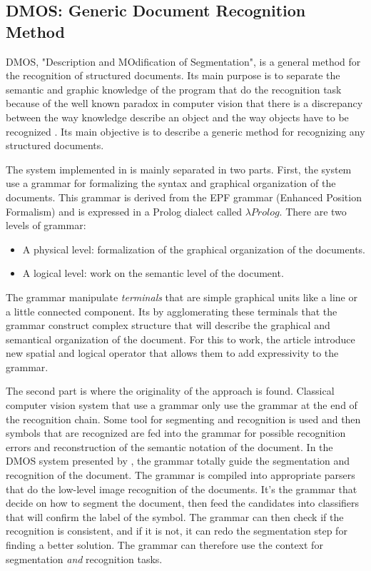 \documentclass[11pt]{sdm}
\begin{document}
\subsection{DMOS: Generic Document Recognition Method}

DMOS, "Description and MOdification of Segmentation", is a general method for the recognition of structured documents.
Its main purpose is to separate the semantic and graphic knowledge of the program that do the recognition task because of the well known paradox in computer vision that there is a discrepancy between the way knowledge describe an object and the way objects have to be recognized \cite{couasnon_dmos_2001}.
Its main objective is to describe a generic method for recognizing any structured documents.

The system implemented in \cite{couasnon_dmos_2001} is mainly separated in two parts.
First, the system use a grammar for formalizing the syntax and graphical organization of the documents.
This grammar is derived from the EPF grammar (Enhanced Position Formalism) and is expressed in a Prolog dialect called $\lambda Prolog$.
There are two levels of grammar:
\begin{itemize}
  \item A physical level: formalization of the graphical organization of the documents.
  \item A logical level: work on the semantic level of the document.
\end{itemize}
The grammar manipulate \textit{terminals} that are simple graphical units like a line or a little connected component.
Its by agglomerating these terminals that the grammar construct complex structure that will describe the graphical and semantical organization of the document.
For this to work, the article introduce new spatial and logical operator that allows them to add expressivity to the grammar.

The second part is where the originality of the approach is found.
Classical computer vision system that use a grammar only use the grammar at the end of the recognition chain.
Some tool for segmenting and recognition is used and then symbols that are recognized are fed into the grammar for possible recognition errors and reconstruction of the semantic notation of the document.
In the DMOS system presented by \cite{couasnon_dmos_2001}, the grammar totally guide the segmentation and recognition of the document.
The grammar is compiled into appropriate parsers that do the low-level image recognition of the documents.
It's the grammar that decide on how to segment the document, then feed the candidates into classifiers that will confirm the label of the symbol.
The grammar can then check if the recognition is consistent, and if it is not, it can redo the segmentation step for finding a better solution.
The grammar can therefore use the context for segmentation \textit{and} recognition tasks.
\end{document}
